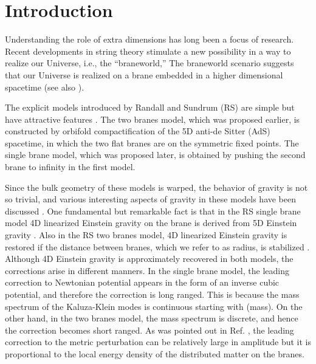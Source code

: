 \documentclass[a4paper,showpacs,preprintnumbers,amsmath,amssymb]{revtex4}
\begin{document}
\section{Introduction}



Understanding the role of extra dimensions has long been a focus of
research. Recent developments in string theory stimulate a
new possibility in a way to realize our Universe, i.e., the ``braneworld,''
The braneworld scenario suggests that our Universe is realized on 
a brane embedded in a higher dimensional spacetime 
\cite{Arkani-Hamed:1998rs,Randall:1999ee,Randall:1999vf}
(see also \cite{Rubakov:1983bb,Visser:1985qm,Akama:1987ig}).



The explicit models introduced by Randall and Sundrum (RS) are 
simple but have attractive features \cite{Randall:1999ee,Randall:1999vf}. 
The two branes model, which was proposed earlier, 
is constructed by orbifold compactification of the 5D anti-de Sitter (AdS) spacetime, in which the two flat branes are on the \coordHE{} symmetric fixed points. The single brane model, which was proposed later, is obtained by pushing the second brane to infinity in the first model.  


Since the bulk geometry of these models is warped, the behavior of gravity is not so trivial, and various interesting aspects of gravity in these models have been discussed \cite{Lykken:2000nb,Mukohyama:2001wq,Garriga:2000yh,Tanaka:2000er,Shiromizu:2000wj,Giddings:2000mu,Tanaka:2000zv,Mukohyama:2001ks,Mukohyama:2001jv}.  
One fundamental but remarkable fact is that in the RS single brane model
4D linearized Einstein gravity on the brane is derived from 5D Einstein gravity \cite{Randall:1999vf,Garriga:2000yh,Giddings:2000mu}. 
Also in the RS two branes model,  4D linearized Einstein gravity is restored  \cite{Tanaka:2000er,Mukohyama:2001ks} if 
the distance between branes, which we refer to as radius, is stabilized 
\cite{Goldberger:1999uk,Goldberger:2000un,DeWolfe:2000cp,Goldberger:2000dv,Arkani-Hamed:2001kx,Luty:2001ec,Hofmann:2001cj,Garriga:2001jb,Garriga:2001ar,Flachi:2001bj,Csaki:2000mp,Nojiri:2000bz,Nojiri:2000eb}.  
Although 4D Einstein gravity is approximately recovered
in both models, the corrections arise in different manners. 
In the single brane model, the leading correction to 
Newtonian potential appears in the form of an inverse cubic potential, and therefore the correction is long ranged.  This is because the mass spectrum of the Kaluza-Klein modes is continuous starting with (mass)\coordHE{}.  
On the other hand, in the two branes model, the mass spectrum is discrete, and hence the correction becomes short ranged. As was pointed out in Ref. \cite{Tanaka:2000zv}, the leading correction to the metric perturbation can be relatively large in amplitude but it is proportional to the local energy density of the distributed matter on the branes. 
\end{document}
